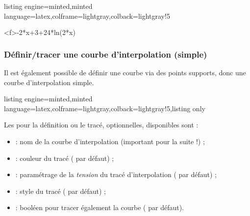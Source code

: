 \documentclass[11pt,a4paper]{ltxdoc}
\begin{document}
\begin{tcblisting}{listing engine=minted,minted language=latex,colframe=lightgray,colback=lightgray!5}
\begin{GraphiqueTikz}%
  [x=0.9cm,y=0.425cm,Xmin=4,Xmax=20,Origx=4,
  Ymin=40,Ymax=56,Ygrille=2,Ygrilles=1,Origy=40]
  \DefinirCourbe[Nom=cf,Debut=5,Fin=19]<f>{-2*x+3+24*ln(2*x)}
\end{GraphiqueTikz}
\end{tcblisting}

\pagebreak

\subsubsection{Définir/tracer une courbe d'interpolation (simple)}\label{deftracinterpo}

Il est également possible de définir une courbe via des points supports, donc une courbe d'interpolation simple.

\begin{tcblisting}{listing engine=minted,minted language=latex,colframe=lightgray,colback=lightgray!5,listing only}
\end{tcblisting}

Les \MontreCode{[clés]} pour la définition ou le tracé, optionnelles, disponibles sont :

\smallskip

\begin{itemize}
  \item {} : nom de la courbe d'interpolation (important pour la suite !) ;
  \item {} : couleur du tracé ( par défaut) ;
  \item {} : paramétrage de la \textit{tension} du tracé d'interpolation ( par défaut) ;
  \item {} : style du tracé ( par défaut) ;
  \item {} : booléen pour tracer également la courbe ( par défaut).
\end{itemize}
\end{document}
